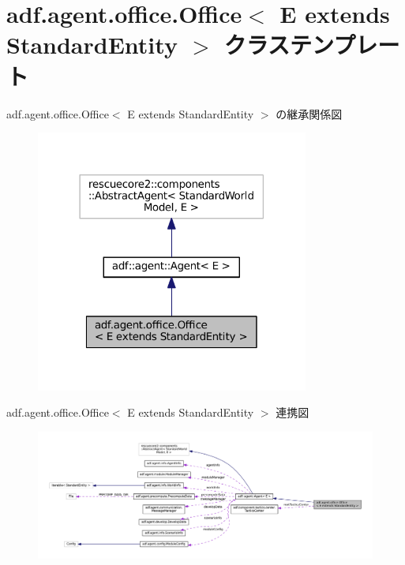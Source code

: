 \hypertarget{classadf_1_1agent_1_1office_1_1Office}{}\section{adf.\+agent.\+office.\+Office$<$ E extends Standard\+Entity $>$ クラステンプレート}
\label{classadf_1_1agent_1_1office_1_1Office}


adf.\+agent.\+office.\+Office$<$ E extends Standard\+Entity $>$ の継承関係図
\nopagebreak
\begin{figure}[H]
\begin{center}
\leavevmode
\includegraphics[width=254pt]{classadf_1_1agent_1_1office_1_1Office__inherit__graph}
\end{center}
\end{figure}


adf.\+agent.\+office.\+Office$<$ E extends Standard\+Entity $>$ 連携図
\nopagebreak
\begin{figure}[H]
\begin{center}
\leavevmode
\includegraphics[width=350pt]{classadf_1_1agent_1_1office_1_1Office__coll__graph}
\end{center}
\end{figure}
